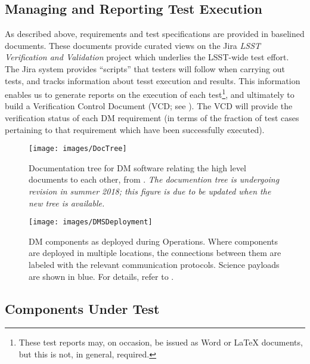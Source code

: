 \subsection{Managing and Reporting Test Execution}
\label{sect:reports}

As described above, requirements and test specifications are provided in baselined documents.
These documents provide curated views on the Jira \emph{LSST Verification and Validation} project which underlies the LSST-wide test effort.
The Jira system provides ``scripts'' that testers will follow when carrying out tests, and tracks information about tesst execution and results.
This information enables us to generate reports on the execution of each test\footnote{These test reports may, on occasion, be issued as Word or LaTeX documents, but this is not, in general, required.}, and ultimately to build a Verification Control Document (VCD; see ).
The VCD will provide the verification status of each DM requirement (in terms of the fraction of test cases pertaining to that requirement which have been successfully executed).

\begin{figure}
\begin{center}
 \texttt{[image: images/DocTree]}

 \caption{Documentation tree for DM software relating the high level documents to each other, from .
 \emph{The documention tree is undergoing revision in summer 2018; this figure is due to be updated when the new tree is available.}
 \label{fig:doctree}}

\end{center}
\end{figure}

\begin{figure}[htbp]
	\begin{center}
		\texttt{[image: images/DMSDeployment]}
		\caption{DM components as deployed during Operations. Where components are
			deployed in multiple locations, the connections between them are labeled with
			the relevant communication protocols. Science payloads are shown in blue.
            For details, refer to .
		\label{fig:dmsdeploy}}
	\end{center}
\end{figure}

\subsection{Components Under Test}

